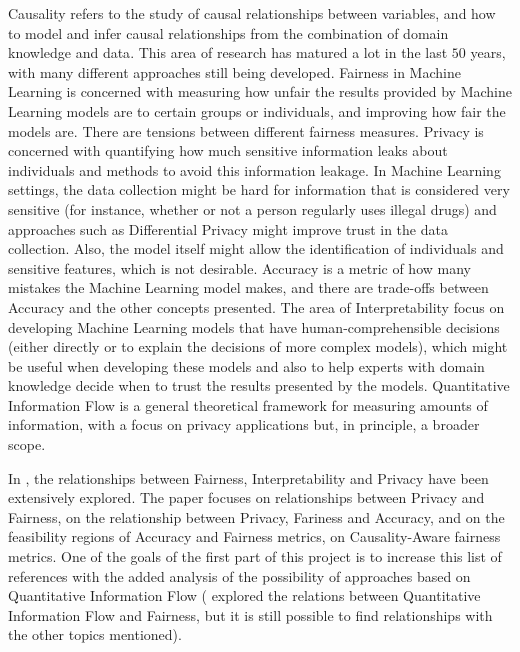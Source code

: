 \documentclass[titlepage]{article}
\begin{document}
Causality refers to the study of causal relationships between variables, and how to model and infer causal relationships from the combination of domain knowledge and data\cite{Causality}. This area of research has matured a lot in the last $50$ years, with many different approaches still being developed. Fairness in Machine Learning is concerned with measuring how unfair the results provided by Machine Learning models are to certain groups or individuals\cite{FairMeasures}, and improving how fair the models are\cite{FairSolve}. There are tensions between different fairness measures\cite{Impossibility}\cite{FairTensions}. Privacy is concerned with quantifying how much sensitive information leaks about individuals and methods to avoid this information leakage. In Machine Learning settings, the data collection might be hard for information that is considered very sensitive (for instance, whether or not a person regularly uses illegal drugs) and approaches such as Differential Privacy\cite{DP} might improve trust in the data collection. Also, the model itself might allow the identification of individuals and sensitive features, which is not desirable\cite{liu2021machine}. Accuracy is a metric of how many mistakes the Machine Learning model makes, and there are trade-offs between Accuracy and the other concepts presented\cite{Sok}\cite{Carlos}\cite{Rachel}. The area of Interpretability focus on developing Machine Learning models that have human-comprehensible decisions (either directly or to explain the decisions of more complex models), which might be useful when developing these models\cite{ExplDev} and also to help experts with domain knowledge decide when to trust the results presented by the models\cite{ExplainExperts}. Quantitative Information Flow is a general theoretical framework for measuring amounts of information, with a focus on privacy applications but, in principle, a broader scope\cite{QIF}.

In \cite{Sok}, the relationships between Fairness, Interpretability and Privacy have been extensively explored. The paper \cite{Awareness} focuses on relationships between Privacy and Fairness, \cite{Rachel} on the relationship between Privacy, Fariness and Accuracy, \cite{Carlos} and \cite{Reductions} on the feasibility regions of Accuracy and Fairness metrics, \cite{CausalFair} on Causality-Aware fairness metrics. One of the goals of the first part of this project is to increase this list of references with the added analysis of the possibility of approaches based on Quantitative Information Flow (\cite{Bruno} explored the relations between Quantitative Information Flow and Fairness, but it is still possible to find relationships with the other topics mentioned).
\end{document}
